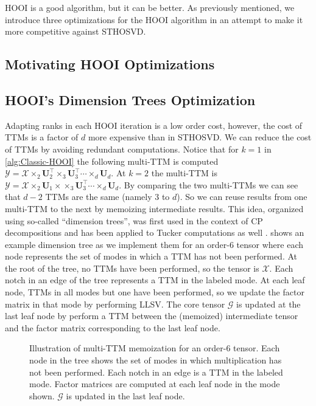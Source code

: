     HOOI is a good algorithm, but it can be better. As previously mentioned, we
    introduce three optimizations for the HOOI algorithm in an attempt to make
    it more competitive against STHOSVD. 

\subsection{Motivating HOOI Optimizations}

\subsection{HOOI's Dimension Trees Optimization}
    Adapting ranks in each HOOI iteration is a low order cost, however, the cost
    of TTMs is a factor of $d$ more expensive than in STHOSVD. We can reduce the
    cost of TTMs by avoiding redundant computations. Notice that for $k = 1$ in
    \cref{alg:Classic-HOOI} the following multi-TTM is computed $\mathcal{Y} =
    \mathcal{X} \times_2 \mathbf{U}_{2}^\intercal \times_3
    \mathbf{U}_{3}^\intercal \cdots \times_d \mathbf{U}_{d}$. At $k = 2$ the
    multi-TTM is $\mathcal{Y} = \mathcal{X} \times_2 \mathbf{U}_{1}\times
    \times_3 \mathbf{U}_{3}^\intercal \cdots \times_d \mathbf{U}_{d}$. By
    comparing the two multi-TTMs we can see that $d - 2$ TTMs are the same
    (namely 3 to $d$). So we can reuse results from one multi-TTM to the next by
    memoizing intermediate results. This idea, organized using so-called
    ``dimension trees'', was first used in the context of CP decompositions
    \cite{PTC13a} and has been applied to Tucker computations as well
    \cite{kaya2019computing,MLB24}.  shows an example
    dimension tree as we implement them for an order-$6$ tensor where each node
    represents the set of modes in which a TTM has not been performed. At the
    root of the tree, no TTMs have been performed, so the tensor is $\mathcal{X}$.
    Each notch in an edge of the tree represents a TTM in the labeled mode. At
    each leaf node, TTMs in all modes but one have been performed, so we update
    the factor matrix in that mode by performing LLSV. The core tensor $\mathcal{G}$
    is updated at the last leaf node by perform a TTM between the (memoized)
    intermediate tensor and the factor matrix corresponding to the last leaf
    node.

    \begin{figure}
        \centering
        
        \label{fig:dimtree}
        \caption[A 6-way Dimension Tree]{Illustration of multi-TTM memoization
        for an order-$6$ tensor. Each node in the tree shows the set of modes in
        which multiplication has not been performed. Each notch in an edge is a
        TTM in the labeled mode.  Factor matrices are computed at each leaf node
        in the mode shown. $\mathcal{G}$ is updated in the last leaf node.}
    \end{figure}

